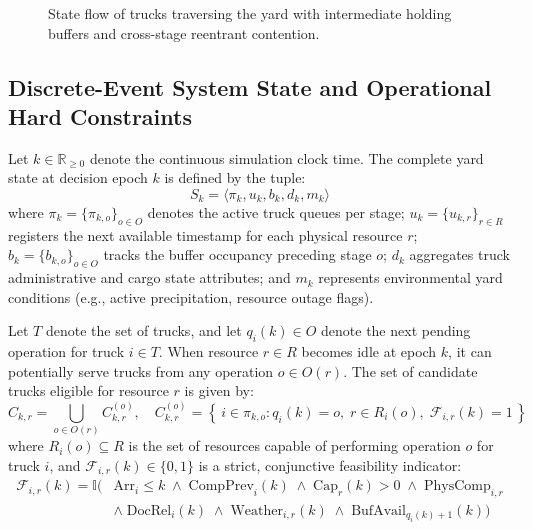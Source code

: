\documentclass[12pt,a4paper]{article}
\begin{document}
\begin{figure}[H]
{%
}
\caption{State flow of trucks traversing the yard with intermediate holding buffers and cross-stage reentrant contention.}
\label{fig:flow-diagram}
\end{figure}

\subsection{Discrete-Event System State and Operational Hard Constraints}
Let $k \in \mathbb{R}_{\ge 0}$ denote the continuous simulation clock time. The complete yard state at decision epoch $k$ is defined by the tuple:
\begin{equation}
  S_k = \langle \pi_k, u_k, b_k, d_k, m_k \rangle
\end{equation}
where $\pi_k = \{\pi_{k,o}\}_{o \in O}$ denotes the active truck queues per stage; $u_k = \{u_{k,r}\}_{r \in R}$ registers the next available timestamp for each physical resource $r$; $b_k = \{b_{k,o}\}_{o \in O}$ tracks the buffer occupancy preceding stage $o$; $d_k$ aggregates truck administrative and cargo state attributes; and $m_k$ represents environmental yard conditions (e.g., active precipitation, resource outage flags).

Let $T$ denote the set of trucks, and let $q_i(k) \in O$ denote the next pending operation for truck $i \in T$. When resource $r \in R$ becomes idle at epoch $k$, it can potentially serve trucks from any operation $o \in O(r)$. The set of candidate trucks eligible for resource $r$ is given by:
\begin{equation}
  C_{k,r} = \bigcup_{o \in O(r)} C^{(o)}_{k,r}, \quad C^{(o)}_{k,r} = \left\{\, i \in \pi_{k,o} : q_i(k)=o,\; r \in R_i(o),\; \mathcal{F}_{i,r}(k)=1 \,\right\}
\end{equation}
where $R_i(o) \subseteq R$ is the set of resources capable of performing operation $o$ for truck $i$, and $\mathcal{F}_{i,r}(k) \in \{0, 1\}$ is a strict, conjunctive feasibility indicator:
\begin{equation}
\begin{aligned}
  \mathcal{F}_{i,r}(k) = \mathbb{I}\Big( & \mathrm{Arr}_i \le k \;\land\; \mathrm{CompPrev}_i(k) \;\land\; \mathrm{Cap}_r(k) > 0 \;\land\; \mathrm{PhysComp}_{i,r} \\
  & \land\; \mathrm{DocRel}_i(k) \;\land\; \mathrm{Weather}_{i,r}(k) \;\land\; \mathrm{BufAvail}_{q_i(k)+1}(k) \Big)
\end{aligned}
\end{equation}
\end{document}
